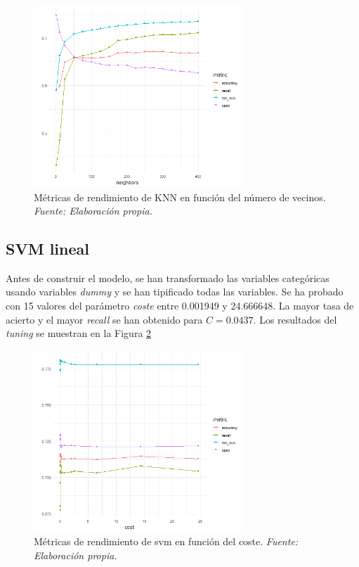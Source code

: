 \documentclass[12pt,a4paper,]{book}
\newcounter{dummy}
\numberwithin{dummy}{section}
\theoremstyle{ocrenumbox}
\theoremstyle{blacknumex}
\theoremstyle{blacknumbox}
\theoremstyle{ocrenum}
\theoremstyle{ocrenum}
\begin{document}
\begin{figure}[h!]
\centering
\includegraphics[width =0.7\textwidth]{graficos/knn_tuningplot.png}
\caption{Métricas de rendimiento de KNN en función del número de vecinos. \it Fuente: Elaboración propia.}
\label{fig:knn_tuningplot}
\end{figure}

\hypertarget{svm-lineal}{%
\subsection{SVM lineal}\label{svm-lineal}}

Antes de construir el modelo, se han transformado las variables
categóricas usando variables \emph{dummy} y se han tipificado todas las
variables. Se ha probado con 15 valores del parámetro \emph{coste} entre
0.001949 y 24.666648. La mayor tasa de acierto y el mayor \emph{recall}
se han obtenido para \(C = 0.0437\). Los resultados del \emph{tuning} se
muestran en la Figura \ref{fig:svm_tuningplot}

\begin{figure}[h!]
\centering
\includegraphics[width =0.7\textwidth]{graficos/svm_tuningplot.png}
\caption{Métricas de rendimiento de svm en función del coste. \it Fuente: Elaboración propia.}
\label{fig:svm_tuningplot}
\end{figure}
\end{document}
